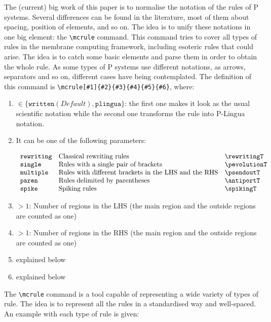 \documentclass{article}
\begin{document}
The (current) big work of this paper is to normalise the notation of
the rules of P systems. Several differences can be found in the
literature, most of them about spacing, position of elements, and so
on. The idea is to unify these notations in one big element: the
\verb=\mcrule= command. This command tries to cover all types of rules
in the membrane computing framework, including esoteric rules that
could arise. The idea is to catch some basic elements and parse them
in order to obtain the whole rule. As some types of P systems use
different notations, as arrows, separators and so on, different cases
have being contemplated. The definition of this command is
\verb=\mcrule[#1]{#2}{#3}{#4}{#5}{#6}=, where:

\begin{enumerate}[label=\texttt{\#\arabic*}]
\item $\in \{\mathtt{written} (\mathit{Default}), \mathtt{plingua}\}$: the first one
  makes it look as the usual scientific notation while the second one
  transforms the rule into P-Lingua notation.
\item It can be one of the following parameters:
  
  $
  \begin{array}{lll}
    \mathtt{rewriting} & \mbox{Classical rewriting rules} & \rewritingT \\
    \mathtt{single} & \mbox{Rules with a single pair of brackets} & \pevolutionT \\
    \mathtt{multiple} & \mbox{Rules with different brackets in the LHS and the RHS} & \psendoutT \\
    \mathtt{paren} & \mbox{Rules delimited by parentheses} & \antiportT \\
    \mathtt{spike} & \mbox{Spiking rules} & \spikingT
  \end{array}
$
\item $> 1$: Number of regions in the LHS (the main region and the outside regions are counted as one)
\item $> 1$: Number of regions in the RHS (the main region and the outside regions are counted as one)
\item explained below
\item explained below
\end{enumerate}

The \verb=\mcrule= command is a tool capable of representing a wide
variety of types of rule. The idea is to represent all the rules in a
standardised way and well-spaced. An example with each type of rule is
given:
\end{document}
